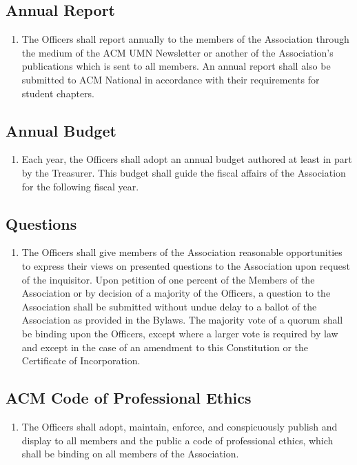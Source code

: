 \subsection{Annual Report}
\begin{enumerate}
	\item The Officers shall report annually to the members of the Association through the medium of the ACM UMN Newsletter or another of the Association's publications which is sent to all members. An annual report shall also be submitted to ACM National in accordance with their requirements for student chapters.
\end{enumerate}

\subsection{Annual Budget}
\begin{enumerate}
	\item Each year, the Officers shall adopt an annual budget authored at least in part by the Treasurer. This budget shall guide the fiscal affairs of the Association for the following fiscal year.
\end{enumerate}

\subsection{Questions}
\begin{enumerate}
	\item The Officers shall give members of the Association reasonable opportunities to express their views on presented questions to the Association upon request of the inquisitor. Upon petition of one percent of the Members of the Association or by decision of a majority of the Officers, a question to the Association shall be submitted without undue delay to a ballot of the Association as provided in the Bylaws. The majority vote of a quorum shall be binding upon the Officers, except where a larger vote is required by law and except in the case of an amendment to this Constitution or the Certificate of Incorporation.
\end{enumerate}

\subsection{ACM Code of Professional Ethics}
\begin{enumerate}
	\item The Officers shall adopt, maintain, enforce, and conspicuously publish and display to all members and the public a code of professional ethics, which shall be binding on all members of the Association.
\end{enumerate}

